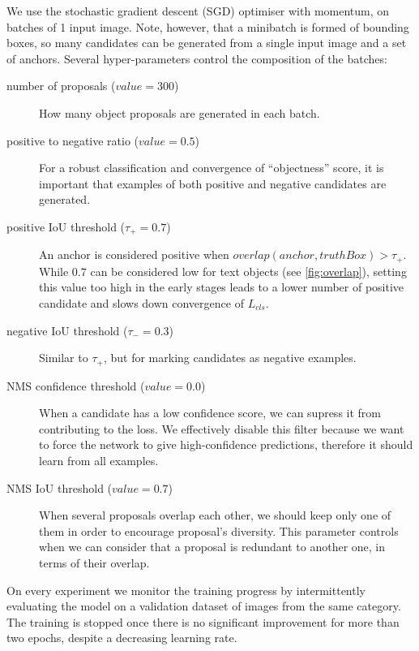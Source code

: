 		We use the stochastic gradient descent (SGD) optimiser with momentum, on batches of 1 input image. Note, however, that a minibatch is formed of bounding boxes, so many candidates can be generated from a single input image and a set of anchors. Several hyper-parameters control the composition of the batches:
		\begin{description}
			\item[number of proposals (\(\mathit{value} = 300\))] How many object proposals are generated in each batch.

			\item[positive to negative ratio (\(\mathit{value} = 0.5\))] For a robust classification and convergence of ``objectness'' score, it is important that examples of both positive and negative candidates are generated.

			\item[positive IoU threshold (\(\tau_{+} = 0.7\))] An anchor is considered positive when \(\mathit{overlap}(\mathit{anchor}, \mathit{truthBox}) > \tau_+\). While \(0.7\) can be considered low for text objects (see \autoref{fig:overlap}), setting this value too high in the early stages leads to a lower number of positive candidate and slows down convergence of \(L_{cls}\).

			\item[negative IoU threshold (\(\tau_{-} = 0.3\))] Similar to \(\tau_{+}\), but for marking candidates as negative examples.

			\item[NMS confidence threshold (\(\mathit{value} = 0.0\))] When a candidate has a low confidence score, we can supress it from contributing to the loss. We effectively disable this filter because we want to force the network to give high-confidence predictions, therefore it should learn from all examples.

			\item[NMS IoU threshold (\(\mathit{value} = 0.7\))] When several proposals overlap each other, we should keep only one of them in order to encourage proposal's diversity. This parameter controls when we can consider that a proposal is redundant to another one, in terms of their overlap.

		\end{description}

		On every experiment we monitor the training progress by intermittently evaluating the model on a validation dataset of images from the same category. The training is stopped once there is no significant improvement for more than two epochs, despite a decreasing learning rate.


